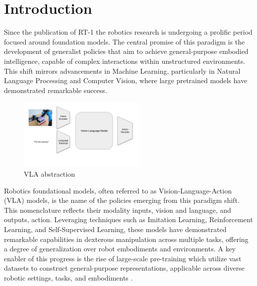 \section{Introduction}


Since the publication of RT-1 \cite{RT-1} the robotics research is undergoing a prolific period focused around foundation models. The central promise of this paradigm is the development of generalist policies that aim to achieve general-purpose embodied intelligence, capable of complex interactions within unstructured environments. This shift mirrors advancements in Machine Learning, particularly in Natural Language Processing and Computer Vision, where large pretrained models have demonstrated remarkable success.

\begin{figure}
    \centering
    \includegraphics[width=0.55\textwidth]{images/vla.jpg}
    \caption{VLA abstraction}
    \label{fig:mesh}
\end{figure}

Robotics foundational models, often referred to as Vision-Language-Action (VLA) models, is the name of the policies emerging from this paradigm shift. This nomenclature reflects their modality inputs, vision and language, and outputs, action. Leveraging techniques such as Imitation Learning, Reinforcement Learning, and Self-Supervised Learning, these models have demonstrated remarkable capabilities in dexterous manipulation across multiple tasks, offering a degree of generalization over robot embodiments and environments. A key enabler of this progress is the rise of large-scale pre-training which utilize vast datasets to construct general-purpose representations, applicable across diverse robotic settings, tasks, and embodiments \cite{TransferWelle}.



